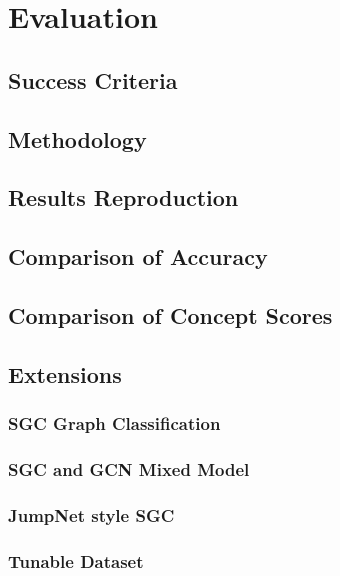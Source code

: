 \chapter{Evaluation}

\section{Success Criteria}

\section{Methodology}

\section{Results Reproduction}

\section{Comparison of Accuracy}

\section{Comparison of Concept Scores}

\section{Extensions}

\subsection{SGC Graph Classification}

\subsection{SGC and GCN Mixed Model}

\subsection{JumpNet style SGC}

\subsection{Tunable Dataset}
